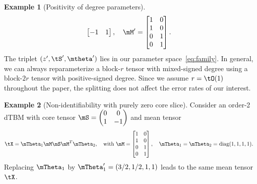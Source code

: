 \documentclass[lettersize,onecolumn,journal]{IEEEtran}
\theoremstyle{definition}
\theoremstyle{definition}
\newtheorem{example}{Example}
\begin{document}
\begin{example}[Positivity of degree parameters]
\begin{equation}
\begin{bmatrix}
    -1 & 1
    \end{bmatrix}, \quad \mM' = \begin{bmatrix}
   1 & 0 \\
   1 &0 \\
    0 & 1 \\
    0&1
    \end{bmatrix}.
\end{equation}
 The triplet $(z',\tS', \mtheta')$ lies in our parameter space~\eqref{eq:family}. In general, we can always reparameterize a block-$r$ tensor with mixed-signed degree using a block-$2r$ tensor with positive-signed degree. Since we assume $r=\tO(1)$ throughout the paper, the splitting does not affect the error rates of our interest.\end{example}
 
 {
 \color{blue}
    \begin{example}[Non-identifiability with purely zero core slice]\label{example:c3} 
 Consider an order-2 dTBM with core tensor $\mS = \begin{pmatrix} 0 & 0\\
    1 & -1
    \end{pmatrix}$ and mean tensor 
    \begin{equation}
        \tX =  \mTheta_1 \mM \mS   \mM^T \mTheta_2, \quad \text{with } \mM = \begin{bmatrix} 1 & 0 \\
        1 & 0 \\
        0 & 1 \\
        0 & 1 \\
        \end{bmatrix}, \quad \mTheta_1 =\mTheta_2= \text{diag}(1,1,1,1).
    \end{equation}
Replacing $\mTheta_1$ by $\mTheta'_1 = (3/2, 1/2, 1,1)$ leads to the same mean tensor $\tX$. 
\end{example}
 
 
     \begin{table}[h]
    \centering
    \caption{Parameter space comparison between previous work with our assumption.}
    \label{tab:para}
\end{table}
 }
\end{document}
